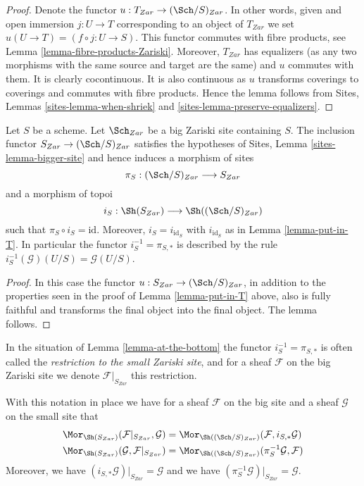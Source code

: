 \begin{proof}
Denote the functor $u : T_{Zar} \to (\Sch/S)_{Zar}$.
In other words, given and open immersion $j : U \to T$ corresponding
to an object of $T_{Zar}$ we set $u(U \to T) = (f \circ j : U \to S)$.
This functor commutes with fibre products, see
Lemma \ref{lemma-fibre-products-Zariski}.
Moreover, $T_{Zar}$ has equalizers (as any two morphisms with the same
source and target are the same) and $u$ commutes with them.
It is clearly cocontinuous.
It is also continuous as $u$ transforms coverings to coverings and
commutes with fibre products. Hence the lemma follows from
Sites, Lemmas \ref{sites-lemma-when-shriek}
and \ref{sites-lemma-preserve-equalizers}.
\end{proof}

\begin{lemma}
\label{lemma-at-the-bottom}
Let $S$ be a scheme. Let $\Sch_{Zar}$ be a big Zariski
site containing $S$.
The inclusion functor $S_{Zar} \to (\Sch/S)_{Zar}$
satisfies the hypotheses of Sites, Lemma \ref{sites-lemma-bigger-site}
and hence induces a morphism of sites
$$
\pi_S : (\Sch/S)_{Zar} \longrightarrow S_{Zar}
$$
and a morphism of topoi
$$
i_S : \Sh(S_{Zar}) \longrightarrow \Sh((\Sch/S)_{Zar})
$$
such that $\pi_S \circ i_S = \text{id}$. Moreover, $i_S = i_{\text{id}_S}$
with $i_{\text{id}_S}$ as in Lemma \ref{lemma-put-in-T}. In particular the
functor $i_S^{-1} = \pi_{S, *}$ is described by the rule
$i_S^{-1}(\mathcal{G})(U/S) = \mathcal{G}(U/S)$.
\end{lemma}

\begin{proof}
In this case the functor $u : S_{Zar} \to (\Sch/S)_{Zar}$,
in addition to the properties seen in the proof of
Lemma \ref{lemma-put-in-T} above, also is fully faithful
and transforms the final object into the final object.
The lemma follows.
\end{proof}

\begin{definition}
\label{definition-restriction-small-zariski}
In the situation of
Lemma \ref{lemma-at-the-bottom}
the functor $i_S^{-1} = \pi_{S, *}$ is often
called the {\it restriction to the small Zariski site}, and for a sheaf
$\mathcal{F}$ on the big Zariski site we denote $\mathcal{F}|_{S_{Zar}}$
this restriction.
\end{definition}

\noindent
With this notation in place we have for a sheaf $\mathcal{F}$ on the
big site and a sheaf $\mathcal{G}$ on the small site that
\begin{align*}
\Mor_{\Sh(S_{Zar})}(\mathcal{F}|_{S_{Zar}}, \mathcal{G})
& =
\Mor_{\Sh((\Sch/S)_{Zar})}(\mathcal{F},
i_{S, *}\mathcal{G}) \\
\Mor_{\Sh(S_{Zar})}(\mathcal{G}, \mathcal{F}|_{S_{Zar}})
& =
\Mor_{\Sh((\Sch/S)_{Zar})}(\pi_S^{-1}\mathcal{G},
\mathcal{F})
\end{align*}
Moreover, we have $(i_{S, *}\mathcal{G})|_{S_{Zar}} = \mathcal{G}$
and we have $(\pi_S^{-1}\mathcal{G})|_{S_{Zar}} = \mathcal{G}$.

